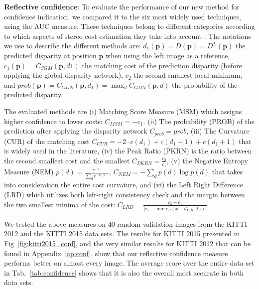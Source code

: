 \documentclass[10pt, twocolumn, letterpaper]{article}
\begin{document}
\textbf{Reflective confidence}:
To evaluate the performance of our new method for confidence indication, we compared it to the six most widely used techniques, using the AUC measure. These techniques belong to different categories according to which aspects of stereo cost estimation they take into account \cite{confpaper}. The notations we use to describe the different methods are: 
$d_1(\mathbf{p}) =  D(\mathbf{p}) = D^L(\mathbf{p})$ the predicted disparity at position $\mathbf{p}$ when using the left image as a reference, $c_1(\mathbf{p}) = C_{SGM}(\mathbf{p},d1)$ the matching cost of the prediction disparity (before applying the global disparity network), $c_2$ the second smallest local minimum, and $prob(\mathbf{p}) = C_{GDN}(\mathbf{p},d_1) = \max_d{C_{GDN}(\mathbf{p},d)}$ the probability of the predicted disparity.

The evaluated methods are (i) Matching Score Measure (MSM)\cite{msm} which assigns higher confidence to lower costs: $C_{MSM} = -c_1$. (ii) The probability (PROB) of the prediction after applying the disparity network $C_{prob}=prob$, (iii) The Curvature (CUR) of the matching cost $C_{CUR}=-2\cdot c(d_1) + c(d_1-1) + c(d_1+1)$ that is widely used in the literature, (iv) the Peak Ratio (PKRN)\cite{confpaper} is the ratio between the second smallest cost and the smallest $C_{PKRN}=\frac{c_2}{c_1}$, (v) the Negative Entropy Measure (NEM)\cite{entropy} $p(d) = \frac{e^{-c_1}}{\sum_{d}{e^{-c(d)}}}$, $C_{NEM}=-\sum_{d}{p(d)\log{p(d)}}$ that takes into consideration the entire cost curvature, and (vi) the Left Right Difference (LRD)\cite{confpaper} which utilizes both left-right consistency check and the margin between the two smallest minima of the cost: $C_{LRD}=\frac{c_2-c_1}{|c_1-\min{c_R(x-d_1,y,d_R)}|}$.

We tested the above measures on 40 random validation images from the KITTI 2012 and the KITTI 2015 data sets. The results for KITTI 2015 presented in Fig~\ref{fig:kitti2015_conf}, and the very similar results for KITTI 2012 that can be found in Appendix~\ref{ap:conf}, show that our reflective confidence measure performs better on almost every image. The average score over the entire data set in Tab.~\ref{tab:confidence} shows that it is also the overall most accurate in both data sets.

\begin{table}[t]
\centering
{}
\caption{The average AUC over the entire validation set for different confidence measures.}
\label{tab:confidence}
\end{table}
\end{document}
